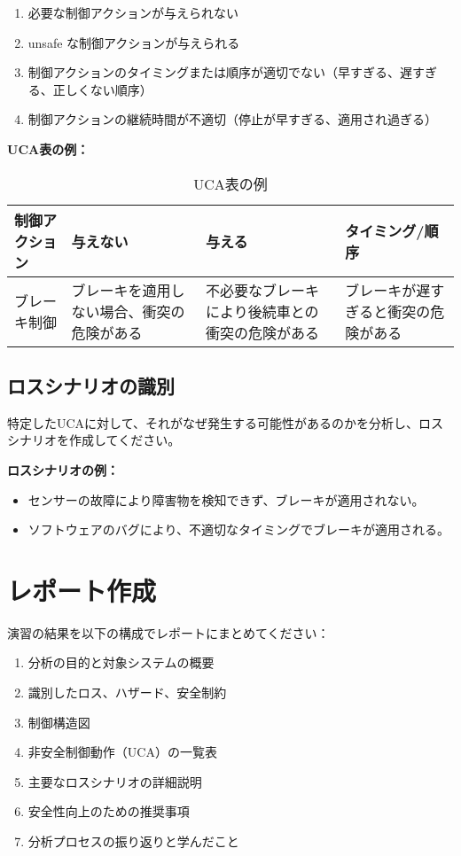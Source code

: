 \begin{enumerate}
    \item 必要な制御アクションが与えられない
    \item unsafe な制御アクションが与えられる
    \item 制御アクションのタイミングまたは順序が適切でない（早すぎる、遅すぎる、正しくない順序）
    \item 制御アクションの継続時間が不適切（停止が早すぎる、適用され過ぎる）
\end{enumerate}

\textbf{UCA表の例：}
\begin{table}[h]
\caption{UCA表の例}
\begin{tabular}{|p{3cm}|p{3cm}|p{3cm}|p{3cm}|}
\hline
制御アクション & 与えない & 与える & タイミング/順序 \\
\hline
ブレーキ制御 & ブレーキを適用しない場合、衝突の危険がある & 不必要なブレーキにより後続車との衝突の危険がある & ブレーキが遅すぎると衝突の危険がある \\
\hline
\end{tabular}
\end{table}

\subsection{ロスシナリオの識別}
特定したUCAに対して、それがなぜ発生する可能性があるのかを分析し、ロスシナリオを作成してください。

\textbf{ロスシナリオの例：}
\begin{itemize}
    \item センサーの故障により障害物を検知できず、ブレーキが適用されない。
    \item ソフトウェアのバグにより、不適切なタイミングでブレーキが適用される。
\end{itemize}

\section{レポート作成}

演習の結果を以下の構成でレポートにまとめてください：

\begin{enumerate}
    \item 分析の目的と対象システムの概要
    \item 識別したロス、ハザード、安全制約
    \item 制御構造図
    \item 非安全制御動作（UCA）の一覧表
    \item 主要なロスシナリオの詳細説明
    \item 安全性向上のための推奨事項
    \item 分析プロセスの振り返りと学んだこと
\end{enumerate}


